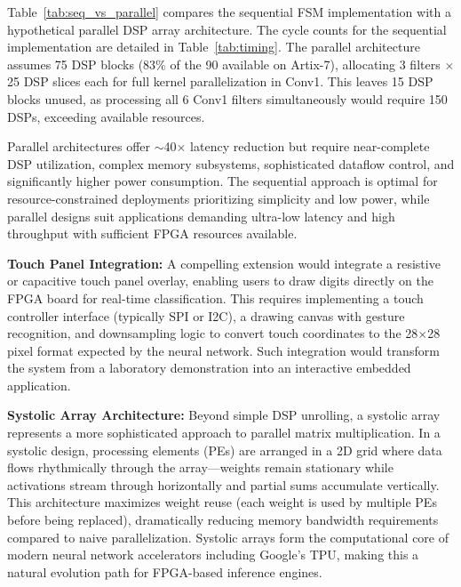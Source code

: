 \documentclass[12pt,a4paper]{report}
\begin{document}
Table~\ref{tab:seq_vs_parallel} compares the sequential FSM implementation with a hypothetical parallel DSP array architecture. The cycle counts for the sequential implementation are detailed in Table~\ref{tab:timing}. The parallel architecture assumes 75 DSP blocks (83\% of the 90 available on Artix-7), allocating 3 filters $\times$ 25 DSP slices each for full kernel parallelization in Conv1. This leaves 15 DSP blocks unused, as processing all 6 Conv1 filters simultaneously would require 150 DSPs, exceeding available resources.

Parallel architectures offer $\sim$40$\times$ latency reduction but require near-complete DSP utilization, complex memory subsystems, sophisticated dataflow control, and significantly higher power consumption. The sequential approach is optimal for resource-constrained deployments prioritizing simplicity and low power, while parallel designs suit applications demanding ultra-low latency and high throughput with sufficient FPGA resources available.

\textbf{Touch Panel Integration:} A compelling extension would integrate a resistive or capacitive touch panel overlay, enabling users to draw digits directly on the FPGA board for real-time classification. This requires implementing a touch controller interface (typically SPI or I2C), a drawing canvas with gesture recognition, and downsampling logic to convert touch coordinates to the 28$\times$28 pixel format expected by the neural network. Such integration would transform the system from a laboratory demonstration into an interactive embedded application.

\textbf{Systolic Array Architecture:} Beyond simple DSP unrolling, a systolic array represents a more sophisticated approach to parallel matrix multiplication. In a systolic design, processing elements (PEs) are arranged in a 2D grid where data flows rhythmically through the array—weights remain stationary while activations stream through horizontally and partial sums accumulate vertically. This architecture maximizes weight reuse (each weight is used by multiple PEs before being replaced), dramatically reducing memory bandwidth requirements compared to naive parallelization. Systolic arrays form the computational core of modern neural network accelerators including Google's TPU, making this a natural evolution path for FPGA-based inference engines.

\printbibliography[heading=bibintoc, title={Bibliography}]
\end{document}
